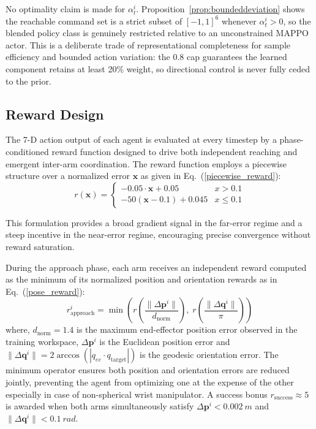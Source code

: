 \documentclass[a4paper,fleqn]{cas-dc}
\begin{document}
No optimality claim is made for $\alpha_t^i$. Proposition~\ref{prop:boundeddeviation} shows the reachable command set is a strict subset of $[-1,1]^6$ whenever $\alpha_t^i > 0$, so the blended policy class is genuinely restricted relative to an unconstrained MAPPO actor. This is a deliberate trade of representational completeness for sample efficiency and bounded action variation: the 0.8 cap guarantees the learned component retains at least 20\% weight, so directional control is never fully ceded to the prior.

\subsection{Reward Design}
\label{reward_design}
The 7-D action output of each agent is evaluated at every timestep by a phase-conditioned reward function designed to drive both independent reaching and emergent inter-arm coordination.\newline
The reward function employs a piecewise structure over a normalized error $\mathbf{x}$ as given in Eq.~(\ref{piecewise_reward}):
\begin{equation}
r(\mathbf{x}) = 
\begin{cases} 
      -0.05\cdot\mathbf{x} + 0.05 &  x > 0.1 \\
      -50(\mathbf{x}-0.1) + 0.045 &  x \leq 0.1
\end{cases}
\label{piecewise_reward}
\end{equation}

This formulation provides a broad gradient signal in the far-error regime and a steep incentive in the near-error regime, encouraging precise convergence without reward saturation.

\noindent During the approach phase, each arm receives an independent reward computed as the minimum of its normalized position and orientation rewards as in Eq.~(\ref{pose_reward}):
\begin{equation}
r^{i}_{\text{approach}} = \min \left(
r\left(\frac{\lVert \Delta \mathbf{p}^i \rVert}{d_\text{norm}}\right),\;
r\left(\frac{\lVert \Delta \mathbf{q}^i \rVert}{\pi}\right)
\right)
\label{pose_reward}
\end{equation}
where, $d_\text{norm} = 1.4$ is the maximum end-effector position error observed in the training workspace,  $\Delta \mathbf{p}^i$ is the Euclidean position error and $\lVert \Delta \mathbf{q}^i \rVert = 2 \arccos \left( \left| q_{ee} \cdot q_{\text{target}} \right| \right)$ is the geodesic orientation error. The minimum operator ensures both position and orientation errors are reduced jointly, preventing the agent from optimizing one at the expense of the other especially in case of non-spherical wrist manipulator. A success bonus $r_\text{success}\approx5$ is awarded when both arms simultaneously satisfy $\Delta \mathbf{p}^i<0.002~m$ and $\lVert \Delta \mathbf{q}^i\rVert<0.1~rad$.
\end{document}
